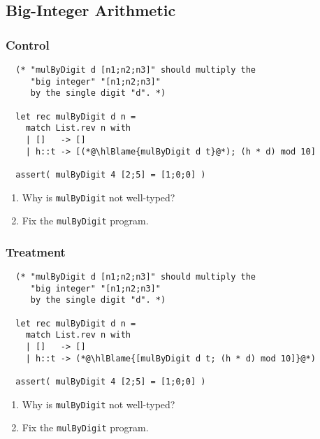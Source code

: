 \documentclass{article}
\newcommand\hlBlame[1]{\colorbox{red!25}{#1}}
\begin{document}
\subsection{Big-Integer Arithmetic}

\subsubsection{Control}
\begin{lstlisting}
  (* "mulByDigit d [n1;n2;n3]" should multiply the
     "big integer" "[n1;n2;n3]"
     by the single digit "d". *)

  let rec mulByDigit d n =
    match List.rev n with
    | []   -> []
    | h::t -> [(*@\hlBlame{mulByDigit d t}@*); (h * d) mod 10]

  assert( mulByDigit 4 [2;5] = [1;0;0] )
\end{lstlisting}

\begin{enumerate}
\item Why is \verb!mulByDigit! not well-typed?
\item Fix the \verb!mulByDigit! program.
\end{enumerate}

\subsubsection{Treatment}
\begin{lstlisting}
  (* "mulByDigit d [n1;n2;n3]" should multiply the
     "big integer" "[n1;n2;n3]"
     by the single digit "d". *)

  let rec mulByDigit d n =
    match List.rev n with
    | []   -> []
    | h::t -> (*@\hlBlame{[mulByDigit d t; (h * d) mod 10]}@*)

  assert( mulByDigit 4 [2;5] = [1;0;0] )
\end{lstlisting}

\begin{enumerate}
\item Why is \verb!mulByDigit! not well-typed?
\item Fix the \verb!mulByDigit! program.
\end{enumerate}
\end{document}
